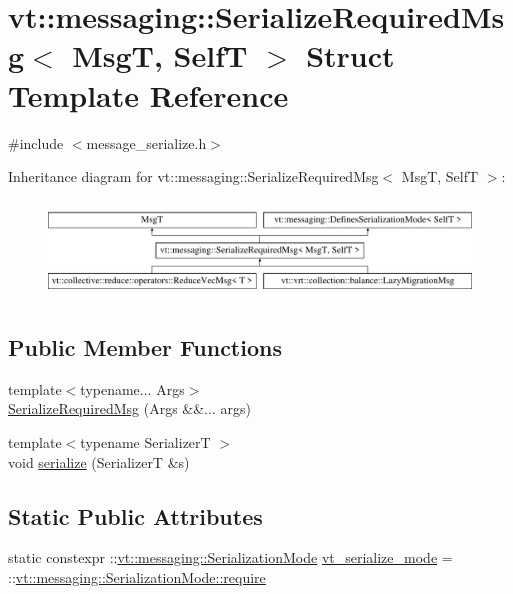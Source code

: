 \hypertarget{structvt_1_1messaging_1_1_serialize_required_msg}{}\section{vt\+:\+:messaging\+:\+:Serialize\+Required\+Msg$<$ MsgT, SelfT $>$ Struct Template Reference}
\label{structvt_1_1messaging_1_1_serialize_required_msg}


{\ttfamily \#include $<$message\+\_\+serialize.\+h$>$}

Inheritance diagram for vt\+:\+:messaging\+:\+:Serialize\+Required\+Msg$<$ MsgT, SelfT $>$\+:\begin{figure}[H]
\begin{center}
\leavevmode
\includegraphics[height=2.600619cm]{structvt_1_1messaging_1_1_serialize_required_msg}
\end{center}
\end{figure}
\subsection*{Public Member Functions}
\begin{DoxyCompactItemize}
\item 
{\footnotesize template$<$typename... Args$>$ }\\\hyperlink{structvt_1_1messaging_1_1_serialize_required_msg_af50357bbc47bf49c049442b6942a75ad}{Serialize\+Required\+Msg} (Args \&\&... args)
\item 
{\footnotesize template$<$typename SerializerT $>$ }\\void \hyperlink{structvt_1_1messaging_1_1_serialize_required_msg_a2e27ae5612c1b78ea9fd982c88f415b0}{serialize} (SerializerT \&s)
\end{DoxyCompactItemize}
\subsection*{Static Public Attributes}
\begin{DoxyCompactItemize}
\item 
static constexpr \+::\hyperlink{namespacevt_1_1messaging_a436c5b9fc7f591e5978a136999cb9ef8}{vt\+::messaging\+::\+Serialization\+Mode} \hyperlink{structvt_1_1messaging_1_1_serialize_required_msg_ac3c448432ebe8ee3c2d454e2034bdd27}{vt\+\_\+serialize\+\_\+mode} = \+::\hyperlink{namespacevt_1_1messaging_a436c5b9fc7f591e5978a136999cb9ef8af0ffd3b7c2574ac324603ed00488c850}{vt\+::messaging\+::\+Serialization\+Mode\+::require}
\end{DoxyCompactItemize}


